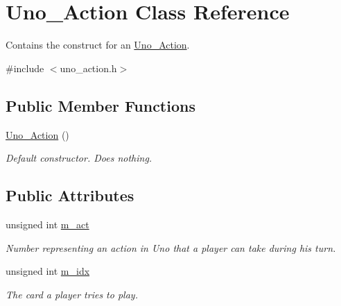 \hypertarget{class_uno___action}{
\section{\-Uno\-\_\-\-Action \-Class \-Reference}
\label{class_uno___action}
}


\-Contains the construct for an \hyperlink{class_uno___action}{\-Uno\-\_\-\-Action}.  




{\ttfamily \#include $<$uno\-\_\-action.\-h$>$}

\subsection*{\-Public \-Member \-Functions}
\begin{DoxyCompactItemize}
\item 
\hypertarget{class_uno___action_a9cf59002f6aedd9295d4afa08533241f}{
\hyperlink{class_uno___action_a9cf59002f6aedd9295d4afa08533241f}{\-Uno\-\_\-\-Action} ()}
\label{class_uno___action_a9cf59002f6aedd9295d4afa08533241f}

\begin{DoxyCompactList}\small\item\em \-Default constructor. \-Does nothing. \end{DoxyCompactList}\end{DoxyCompactItemize}
\subsection*{\-Public \-Attributes}
\begin{DoxyCompactItemize}
\item 
unsigned int \hyperlink{class_uno___action_a0e38e567ca993649d2513dd81c386677}{m\-\_\-act}
\begin{DoxyCompactList}\small\item\em \-Number representing an action in \-Uno that a player can take during his turn. \end{DoxyCompactList}\item 
unsigned int \hyperlink{class_uno___action_a228de2b5b030253562cadd34f21568c4}{m\-\_\-idx}
\begin{DoxyCompactList}\small\item\em \-The card a player tries to play. \end{DoxyCompactList}\end{DoxyCompactItemize}


